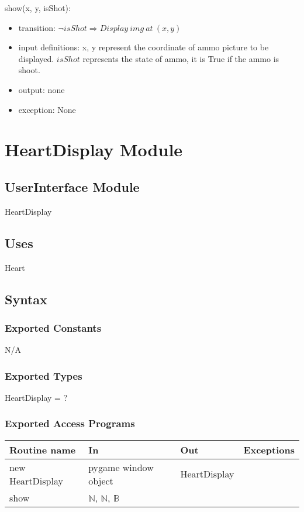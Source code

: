 \documentclass[12pt]{article}
\begin{document}
\noindent show(x, y, isShot):
\begin{itemize}
    \item transition: $\lnot isShot \Rightarrow Display\ img\ at\ (x, y)$
    \item input definitions: x, y represent the coordinate of ammo picture
    to be displayed. $isShot$ represents the state of ammo, it is True if the ammo is shoot.
    \item output: none
    \item exception: None
\end{itemize}
\newpage

\section{HeartDisplay Module}

\subsection*{UserInterface Module}
HeartDisplay

\subsection*{Uses}
Heart

\subsection*{Syntax}
\subsubsection*{Exported Constants}
N/A
\subsubsection*{Exported Types}
HeartDisplay = ?
\subsubsection*{Exported Access Programs}

\begin{tabular}{| l | l | l | l |}
\hline
\textbf{Routine name} & \textbf{In} & \textbf{Out} & \textbf{Exceptions}\\
\hline
new HeartDisplay       &pygame window object&     HeartDisplay        &           \\
\hline
show       &	 $\mathbb{N}$, $\mathbb{N}$, $\mathbb{B}$    &           &          \\
\hline
\end{tabular}
\end{document}
